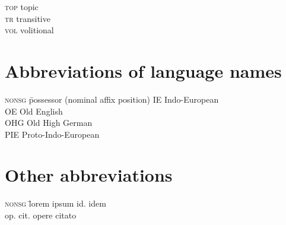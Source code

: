 \begin{refsection}
\begin{multicols}{2}
\begin{tabbing}
	\textsc{top} \>  topic\\
	
	\textsc{tr} \>  transitive\\
	
	\textsc{vol} \>  volitional\\
\end{tabbing}
\end{multicols}

\section*{Abbreviations of language names}

\begin{multicols}{2}\setlength{\parindent}{0pt}
\begin{tabbing}
\textsc{nonsg} \= possessor (nominal affix position) \kill	IE \> Indo-European\\

	OE \> Old English\\[\fill\columnbreak]

	OHG \> Old High German\\

	PIE \> Proto-Indo-European \\
\end{tabbing}	
\end{multicols}
%	
%	
	

	
%	
%	
	

		


	
%
%	

	
%	
%	
%	
%	
%	
%	
%	
%	
%	
%	
%	
%	
%	
%	
%	
%	
%	
%	
%	
%	
%	
%	
%	
%	
%	



\section*{Other abbreviations}
\begin{multicols}{2}\setlength{\parindent}{0pt}
\begin{tabbing}
\textsc{nonsg} \= lorem ipsum \kill		
		id. \> idem\\[\fill\columnbreak]
		{op. cit.} \> opere citato\\
	
\end{tabbing}
\end{multicols}
\printbibliography[heading=subbibliography]
\end{refsection}

\setlength{\parindent}{10pt}